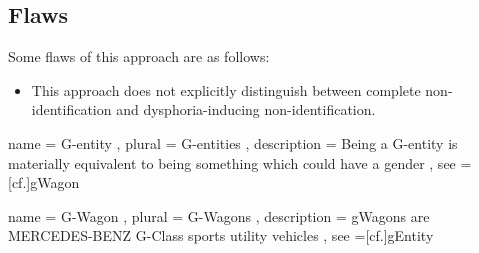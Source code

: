 \documentclass{article}
\theoremstyle{remark}
\begin{document}
\subsection{Flaws}
Some flaws of this approach are as follows:

\begin{itemize}
  \item This approach does not explicitly distinguish between complete non-identification and dysphoria-inducing non-identification.
\end{itemize}

\printbibliography{}

  { name = {G-entity}
  , plural = {G-entities}
  , description = Being a G-entity is materially equivalent to being something which could have a gender
  , see =[cf.]{gWagon}
  }

  { name = {G-Wagon}
  , plural = {G-Wagons}
  , description = \glspl{gWagon} are MERCEDES-BENZ G-Class sports utility vehicles
  , see =[cf.]{gEntity}
  }


\printglossary{}
\end{document}
